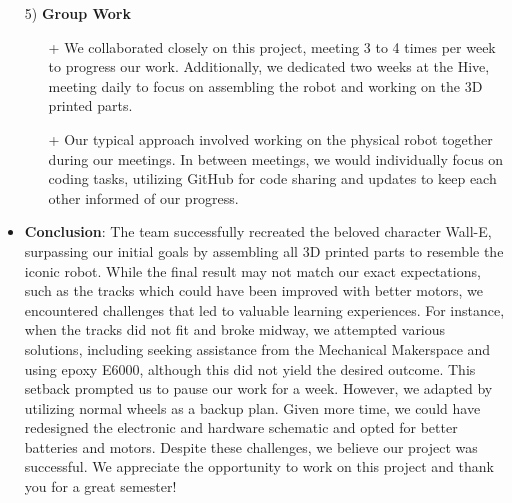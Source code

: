 \documentclass[12pt]{article}
\begin{document}
\begin{itemize}
    \item[5)] \textbf{Group Work}
    \begin{enumerate}
        \item[+] We collaborated closely on this project, meeting 3 to 4 times per week to progress our work. Additionally, we dedicated two weeks at the Hive, meeting daily to focus on assembling the robot and working on the 3D printed parts.
        \item[+] Our typical approach involved working on the physical robot together during our meetings. In between meetings, we would individually focus on coding tasks, utilizing GitHub for code sharing and updates to keep each other informed of our progress.
    \end{enumerate}

    \item \textbf{Conclusion}: The team successfully recreated the beloved character Wall-E, surpassing our initial goals by assembling all 3D printed parts to resemble the iconic robot. While the final result may not match our exact expectations, such as the tracks which could have been improved with better motors, we encountered challenges that led to valuable learning experiences. For instance, when the tracks did not fit and broke midway, we attempted various solutions, including seeking assistance from the Mechanical Makerspace and using epoxy E6000, although this did not yield the desired outcome. This setback prompted us to pause our work for a week. However, we adapted by utilizing normal wheels as a backup plan. Given more time, we could have redesigned the electronic and hardware schematic and opted for better batteries and motors. Despite these challenges, we believe our project was successful. We appreciate the opportunity to work on this project and thank you for a great semester!
\end{itemize}
\end{document}
